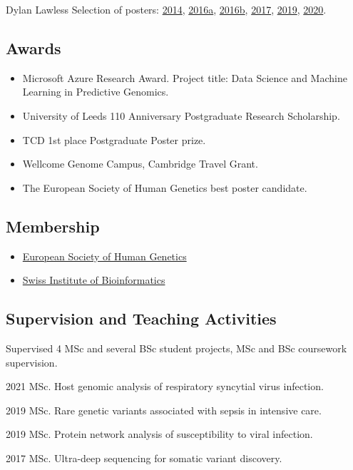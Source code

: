 \documentclass[12pt,a4paper]{article}
\begin{document}
\begin{cv}{Dylan Lawless}
\noindent Selection of posters:
\href{https://dylanlawless.github.io/resume/blob/main/pdf/posters/2014_lawless_poxviral_evasion}{2014},
\href{https://dylanlawless.github.io/resume/blob/main/pdf/posters/2016_ESID_lawless_RAG1}{2016a},
\href{https://dylanlawless.github.io/resume/blob/main/pdf/posters/2016_ESID_lawless_TTC7A}{2016b},
\href{https://dylanlawless.github.io/resume/blob/main/pdf/posters/2017_ESID_lawless_TNFAIP3_A20}{2017},
\href{https://dylanlawless.github.io/resume/blob/main/pdf/posters/2019_ESHG_lawless_viral_succept}{2019},
\href{https://dylanlawless.github.io/resume/blob/main/pdf/posters/2020_lawless_rare_variant_networks}{2020}.

\subsection*{Awards}
\begin{itemize}
\item Microsoft Azure Research Award. Project title: Data Science and Machine Learning in Predictive Genomics. 
\item University of Leeds 110 Anniversary Postgraduate Research Scholarship.
\item TCD 1st place Postgraduate Poster prize.
\item Wellcome Genome Campus, Cambridge Travel Grant.
\item The European Society of Human Genetics best poster candidate.
\end{itemize}


\subsection*{Membership}
\begin{itemize}
\item \href{https://www.eshg.org}{European Society of Human Genetics}
\item \href{https://www.sib.swiss}{Swiss Institute of Bioinformatics}
\end{itemize}

\subsection*{Supervision and Teaching Activities}
Supervised 4 MSc and several BSc student projects, MSc and BSc coursework supervision.
\begin{cvlist}{}
  \item [2021 MSc.  Host genomic analysis of respiratory syncytial virus infection.]
  \item [2019 MSc. Rare genetic variants associated with sepsis in intensive care.]
  \item [2019 MSc. Protein network analysis of susceptibility to viral infection.]
 \item [2017 MSc. Ultra-deep sequencing for somatic variant discovery.]


\end{cvlist}
\end{cv}
\end{document}
